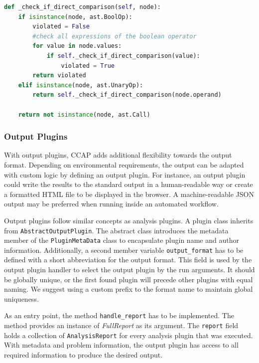 \begin{lstlisting}[float, floatplacement=h, language=Python, label=lst:condition_coparison, caption={Recursive function to analyse an if statement for direct comparisons. Since a condition should contain a method call, the function returns False if this is not the case.}]
def _check_if_direct_comparison(self, node):
    if isinstance(node, ast.BoolOp):
        violated = False
        #check all expressions of the boolean operator
        for value in node.values:
            if self._check_if_direct_comparison(value):
                violated = True
        return violated
    elif isinstance(node, ast.UnaryOp):
        return self._check_if_direct_comparison(node.operand)

    return not isinstance(node, ast.Call)\end{lstlisting}

\subsubsection{Output Plugins}
With output plugins, CCAP adds additional flexibility towards the output format. Depending on environmental requirements, the output can be adapted with custom logic by defining an output plugin. For instance, an output plugin could write the results to the standard output in a human-readable way or create a formatted HTML file to be displayed in the browser. A machine-readable JSON output may be preferred when running inside an automated workflow.

Output plugins follow similar concepts as analysis plugins. A plugin class inherits from \texttt{AbstractOutputPlugin}. The abstract class introduces the metadata member of the \texttt{PluginMetaData} class to encapsulate plugin name and author information. Additionally, a second member variable \texttt{output\_format} has to be defined with a short abbreviation for the output format. This field is used by the output plugin handler to select the output plugin by the run arguments. It should be globally unique, or the first found plugin will precede other plugins with equal naming. We suggest using a custom prefix to the format name to maintain global uniqueness.

As an entry point, the method \texttt{handle\_report} has to be implemented. The method provides an instance of \textit{FullReport} as its argument. The \texttt{report} field holds a collection of \texttt{AnalysisReport} for every analysis plugin that was executed. With metadata and problem information, the output plugin has access to all required information to produce the desired output.

